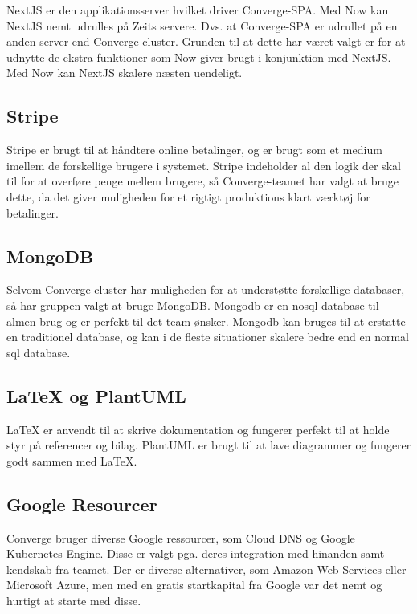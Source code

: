 NextJS er den applikationsserver hvilket driver Converge-SPA. Med Now kan NextJS nemt udrulles på Zeits servere. Dvs. at Converge-SPA er udrullet på en anden server end Converge-cluster. Grunden til at dette har været valgt er for at udnytte de ekstra funktioner som Now giver brugt i konjunktion med NextJS. Med Now kan NextJS skalere næsten uendeligt.

\subsection{Stripe}

Stripe er brugt til at håndtere online betalinger, og er brugt som et medium imellem de forskellige brugere i systemet. Stripe indeholder al den logik der skal til for at overføre penge mellem brugere, så Converge-teamet har valgt at bruge dette, da det giver muligheden for et rigtigt produktions klart værktøj for betalinger.

\subsection{MongoDB}

Selvom Converge-cluster har muligheden for at understøtte forskellige databaser, så har gruppen valgt at bruge MongoDB. Mongodb er en nosql database til almen brug og er perfekt til det team ønsker. Mongodb kan bruges til at erstatte en traditionel database, og kan i de fleste situationer skalere bedre end en normal sql database.

\subsection{LaTeX og PlantUML}

LaTeX er anvendt til at skrive dokumentation og fungerer perfekt til at holde styr på referencer og bilag. PlantUML er brugt til at lave diagrammer og fungerer godt sammen med LaTeX.

\subsection{Google Resourcer}

Converge bruger diverse Google ressourcer, som Cloud DNS \cite{application-development-dokumentation} og Google Kubernetes Engine. Disse er valgt pga. deres integration med hinanden samt kendskab fra teamet. Der er diverse alternativer, som Amazon Web Services eller Microsoft Azure, men med en gratis startkapital fra Google var det nemt og hurtigt at starte med disse.
